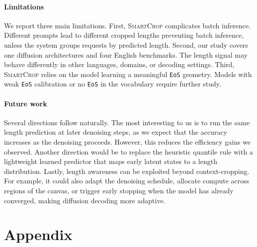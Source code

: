 \documentclass{article}
\theoremstyle{plain}
\theoremstyle{definition}
\theoremstyle{remark}
\begin{document}
\paragraph{Limitations}
We report three main limitations.
First, \textsc{SmartCrop} complicates batch inference.
Different prompts lead to different cropped lengths preventing batch inference, unless the system groups requests by predicted length.
Second, our study covers one diffusion architectures and four English benchmarks.
The length signal may behave differently in other languages, domains, or decoding settings.
Third, \textsc{SmartCrop} relies on the model learning a meaningful \texttt{EoS} geometry.
Models with weak \texttt{EoS} calibration or no \texttt{EoS} in the vocabulary require further study.

\paragraph{Future work}
Several directions follow naturally.
The most interesting to us is to run the same length prediction at later denoising steps, as we expect that the accuracy increases as the denoising proceeds. However, this reduces the efficiency gains we observed.
Another direction would be to replace the heuristic quantile rule with a lightweight learned predictor that maps early latent states to a length distribution.
Lastly, length awareness can be exploited beyond context-cropping. For example, it could also adapt the denoising schedule, allocate compute across regions of the canvas, or trigger early stopping when the model has already converged, making diffusion decoding more adaptive.

\newpage

\nocite{langley00}




\newpage
\appendix
\onecolumn
\section{Appendix}
\label{sec:appendix}
\end{document}
